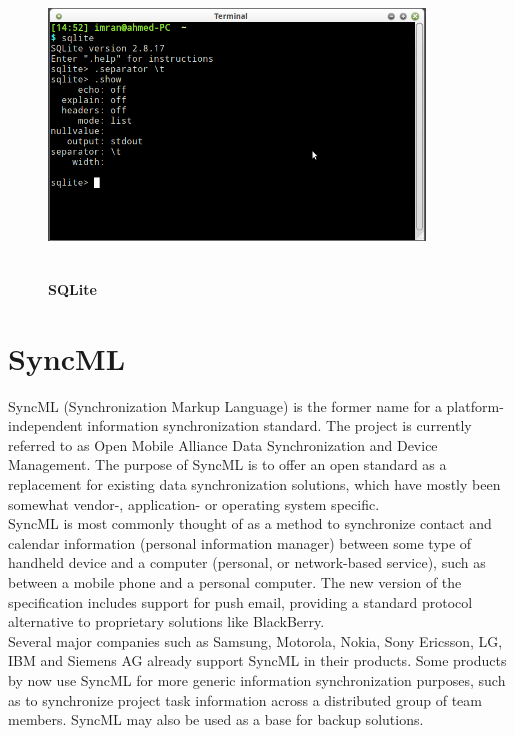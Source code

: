\begin{figure}[H]
  \centering
    \includegraphics[height=8cm, width=10cm]{project/images/sqlite}
  \caption{\textbf{SQLite}}
\end{figure}

\section{SyncML}
\hspace*{0.82cm}SyncML (Synchronization Markup Language) is the former name for a platform-independent information synchronization 
standard. The project is currently referred to as Open Mobile Alliance Data Synchronization and Device Management. The purpose of 
SyncML is to offer an open standard as a replacement for existing data synchronization solutions, which have mostly been somewhat 
vendor-, application- or operating system specific.\\[0.5cm]
\hspace*{0.82cm}SyncML is most commonly thought of as a method to synchronize contact and calendar information (personal 
information manager) between some type of handheld device and a computer (personal, or network-based service), such as between a 
mobile phone and a personal computer. The new version of the specification includes support for push email, providing a standard 
protocol alternative to proprietary solutions like BlackBerry.\\[0.5cm]
\hspace*{0.82cm}Several major companies such as Samsung, Motorola, Nokia, Sony Ericsson, LG, IBM and Siemens AG already support 
SyncML in their products. Some products by now use SyncML for more generic information synchronization purposes, such as to synchronize 
project task information across a distributed group of team members. SyncML may also be used as a base for backup solutions.